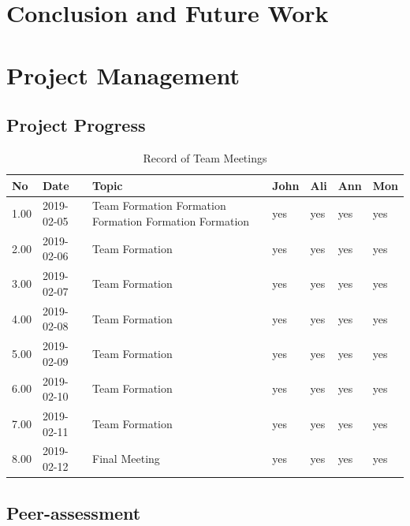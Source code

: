 \documentclass[10pt]{article}\usepackage[]{graphicx}\usepackage[]{color}
\begin{document}
\section{Conclusion and Future Work}\label{cdsmote1}

\blindtext[2]





\section{Project Management}\label{mgt}

\subsection{Project Progress}
\blindtext[2]
\begin{table}[ht]
\centering
\caption{Record of Team Meetings} 
\label{tab:one}
\begin{tabular}{llp{8cm}llll}
  \hline
No & Date & Topic & John & Ali & Ann & Mon \\ 
  \hline
1.00 & 2019-02-05 & Team Formation Formation Formation Formation Formation  & yes & yes & yes & yes \\ 
  2.00 & 2019-02-06 & Team Formation & yes & yes & yes & yes \\ 
  3.00 & 2019-02-07 & Team Formation & yes & yes & yes & yes \\ 
  4.00 & 2019-02-08 & Team Formation & yes & yes & yes & yes \\ 
  5.00 & 2019-02-09 & Team Formation & yes & yes & yes & yes \\ 
  6.00 & 2019-02-10 & Team Formation & yes & yes & yes & yes \\ 
  7.00 & 2019-02-11 & Team Formation & yes & yes & yes & yes \\ 
  8.00 & 2019-02-12 & Final Meeting & yes & yes & yes & yes \\ 
   \hline
\end{tabular}
\end{table}





\subsection{Peer-assessment}
\end{document}
